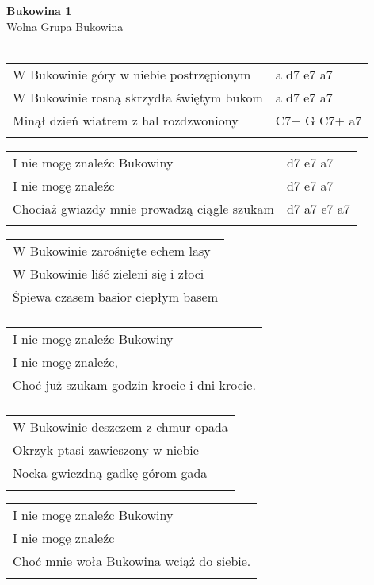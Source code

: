 \documentclass[a5paper]{article}
\begin{document}


\noindent
\fontsize{12pt}{15pt}\selectfont
\textbf{Bukowina 1} \\
\fontsize{8pt}{10pt}\selectfont
Wolna Grupa Bukowina \\ \\
\fontsize{10pt}{12pt}\selectfont
{}
\begin{tabular}{@{}p{8.3cm}p{3cm}@{}}
\noindent
W Bukowinie góry w niebie postrzępionym & a d7 e7 a7 \\
W Bukowinie rosną skrzydła świętym bukom & a d7 e7 a7 \\
Minął dzień wiatrem z hal rozdzwoniony & C7+ G C7+ a7 \\ \\
\end{tabular}

\noindent
\begin{tabular}{@{}p{7.3cm}p{3cm}@{}}
I nie mogę znaleźc Bukowiny & d7 e7 a7 \\
I nie mogę znaleźc & d7 e7 a7 \\
Chociaż gwiazdy mnie prowadzą ciągle szukam & d7 a7 e7 a7 \\ \\
\end{tabular}

\noindent
\begin{tabular}{@{}p{9.5cm}@{}}
W Bukowinie zarośnięte echem lasy \\
W Bukowinie liść zieleni się i złoci \\
Śpiewa czasem basior ciepłym basem \\ \\
\end{tabular}

\noindent
\begin{tabular}{@{}p{8.5cm}@{}}
I nie mogę znaleźc Bukowiny \\
I nie mogę znaleźc, \\
Choć już szukam godzin krocie i dni krocie. \\ \\
\end{tabular}

\noindent
\begin{tabular}{@{}p{9.5cm}@{}}
W Bukowinie deszczem z chmur opada \\
Okrzyk ptasi zawieszony w niebie \\
Nocka gwiezdną gadkę górom gada \\ \\
\end{tabular}

\noindent
\begin{tabular}{@{}p{8.5cm}@{}}
I nie mogę znaleźc Bukowiny \\
I nie mogę znaleźc \\
Choć mnie woła Bukowina wciąż do siebie. \\ \\
\end{tabular}
\end{document}
